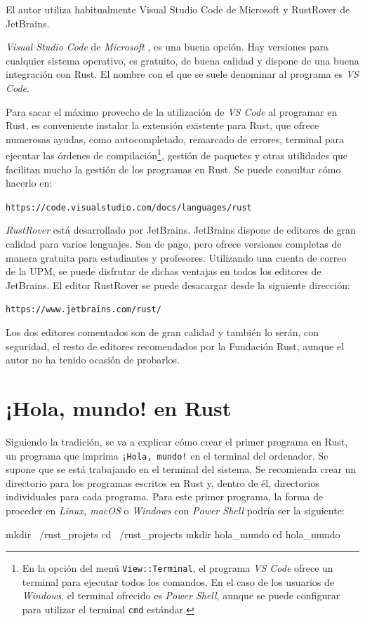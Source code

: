 El autor utiliza habitualmente Visual Studio Code de Microsoft y RustRover de JetBrains. 

\textit{Visual Studio Code} de \textit{Microsoft} \citep{VisualStudioCode}, es una buena opción. Hay versiones para cualquier sistema operativo, es gratuito, de buena calidad y dispone de una buena integración con Rust. El nombre con el que se suele denominar al
programa es \textit{VS Code}.

Para sacar el máximo provecho de la utilización de \textit{VS Code} al programar en Rust, es conveniente instalar la extensión existente para Rust, que ofrece numerosas ayudas, como autocompletado, remarcado de errores, terminal para ejecutar las órdenes de compilación\footnote{En la opción del menú \texttt{View::Terminal}, el programa  \textit{VS Code} ofrece un terminal para ejecutar todos los comandos. En el caso de los usuarios de \textit{Windows}, el terminal ofrecido es \textit{Power Shell}, aunque se puede configurar para utilizar el terminal \texttt{cmd} estándar.}, gestión de paquetes
y otras utilidades que facilitan mucho la gestión de los programas en Rust. Se puede consultar cómo hacerlo en:

{\centering \small \texttt{https://code.visualstudio.com/docs/languages/rust} \par}

\textit{RustRover} está desarrollado por JetBrains. JetBrains dispone de editores de gran calidad para varios lenguajes. Son de pago, pero ofrece versiones completas de manera gratuita para estudiantes y profesores. Utilizando una cuenta de correo de la UPM, se puede disfrutar de dichas ventajas en todos los editores de JetBrains. El editor RustRover se puede desacargar desde la siguiente dirección:

{\centering \small \texttt{https://www.jetbrains.com/rust/} \par}

Los dos editores comentados son de gran calidad y también lo serán, con seguridad, el resto de editores recomendados por la Fundación Rust, aunque el autor no ha tenido ocasión de probarlos.

\pagebreak

\section{¡Hola, mundo! en Rust}
\noindent Siguiendo la tradición, se va a explicar cómo crear el primer programa en Rust, un programa que imprima \texttt{¡Hola, mundo!} en el terminal del ordenador. Se supone que se está trabajando en el terminal del sistema. Se recomienda crear un directorio para los programas escritos en Rust y, dentro de él, directorios individuales para cada programa. Para este primer programa, la forma de proceder en \textit{Linux, macOS} o \textit{Windows} con \textit{Power Shell} podría ser la siguiente:
\begin{Codigo}
mkdir ~/rust_projets
cd ~/rust_projects
mkdir hola_mundo
cd hola_mundo
\end{Codigo}


